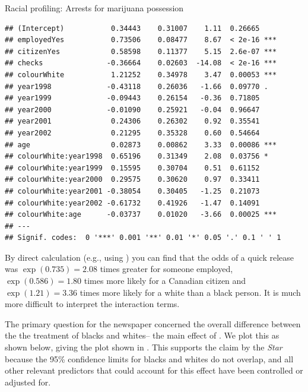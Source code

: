 \documentclass[11pt]{book}
\renewenvironment{knitrout}{\small\renewcommand{\baselinestretch}{.85}}{} %
\begin{document}
\begin{Example}[arrests]{Racial profiling: Arrests for marijuana possession}
\begin{knitrout}
\begin{kframe}
\begin{verbatim}
## (Intercept)           0.34443    0.31007    1.11  0.26665    
## employedYes           0.73506    0.08477    8.67  < 2e-16 ***
## citizenYes            0.58598    0.11377    5.15  2.6e-07 ***
## checks               -0.36664    0.02603  -14.08  < 2e-16 ***
## colourWhite           1.21252    0.34978    3.47  0.00053 ***
## year1998             -0.43118    0.26036   -1.66  0.09770 .  
## year1999             -0.09443    0.26154   -0.36  0.71805    
## year2000             -0.01090    0.25921   -0.04  0.96647    
## year2001              0.24306    0.26302    0.92  0.35541    
## year2002              0.21295    0.35328    0.60  0.54664    
## age                   0.02873    0.00862    3.33  0.00086 ***
## colourWhite:year1998  0.65196    0.31349    2.08  0.03756 *  
## colourWhite:year1999  0.15595    0.30704    0.51  0.61152    
## colourWhite:year2000  0.29575    0.30620    0.97  0.33411    
## colourWhite:year2001 -0.38054    0.30405   -1.25  0.21073    
## colourWhite:year2002 -0.61732    0.41926   -1.47  0.14091    
## colourWhite:age      -0.03737    0.01020   -3.66  0.00025 ***
## ---
## Signif. codes:  0 '***' 0.001 '**' 0.01 '*' 0.05 '.' 0.1 ' ' 1
\end{verbatim}
\end{kframe}
\end{knitrout}
By direct calculation (e.g., using ) you can find that
the odds of a quick release was $\exp({0.735})= 2.08$ times greater for someone employed,
$\exp({0.586})= 1.80$ times more likely for a Canadian citizen and 
$\exp({1.21})= 3.36$ times more likely for a white than a black person.
It is much more difficult to interpret the interaction terms.

The primary question for the newspaper concerned the overall difference between the 
the treatment of blacks and whites-- the main effect of .
We plot this as shown below, giving the plot shown in .
This supports the claim by the \emph{Star} because the 95\% confidence limits for
blacks and whites do not overlap, and all other relevant predictors that could
account for this effect have been controlled or adjusted for.

\begin{knitrout}
\color{fgcolor}\begin{kframe}
\begin{alltt}
\hlstd{(}\hlstd{(}
     \hlstd{=}\hlstd{,} \hlstd{=}\hlstd{,} \hlstd{=}\hlstd{,}
      \hlstd{=} \hlstd{(}\hlstd{,} \hlstd{=}\hlstd{),}
      \hlstd{=} \hlstd{(}\hlstd{,} \hlstd{=}\hlstd{)}
  \hlstd{)}
\end{alltt}
\end{kframe}\begin{figure}[!htbp]



\end{figure}
\end{knitrout}
\end{Example}
\end{document}

